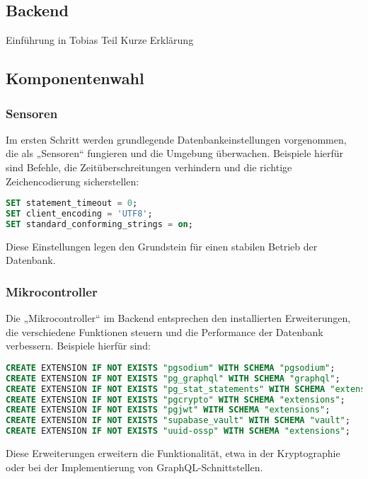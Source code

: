 \begin{inhalt}
\renewcommand*\chapterpagestyle{scrheadings}
\chapter{Backend}

Einführung in Tobias Teil Kurze Erklärung

\section{Komponentenwahl}

\subsection{Sensoren}
Im ersten Schritt werden grundlegende Datenbankeinstellungen vorgenommen, die als „Sensoren“ fungieren und die Umgebung überwachen. Beispiele hierfür sind Befehle, die Zeitüberschreitungen verhindern und die richtige Zeichencodierung sicherstellen:
\begin{lstlisting}[language=SQL, caption=Grundlegende Datenbankeinstellungen]
SET statement_timeout = 0;
SET client_encoding = 'UTF8';
SET standard_conforming_strings = on;
\end{lstlisting}
Diese Einstellungen legen den Grundstein für einen stabilen Betrieb der Datenbank.

\subsection{Mikrocontroller}
Die „Mikrocontroller“ im Backend entsprechen den installierten Erweiterungen, die verschiedene Funktionen steuern und die Performance der Datenbank verbessern. Beispiele hierfür sind:
\begin{lstlisting}[language=SQL, caption=Installation von Erweiterungen]
CREATE EXTENSION IF NOT EXISTS "pgsodium" WITH SCHEMA "pgsodium";
CREATE EXTENSION IF NOT EXISTS "pg_graphql" WITH SCHEMA "graphql";
CREATE EXTENSION IF NOT EXISTS "pg_stat_statements" WITH SCHEMA "extensions";
CREATE EXTENSION IF NOT EXISTS "pgcrypto" WITH SCHEMA "extensions";
CREATE EXTENSION IF NOT EXISTS "pgjwt" WITH SCHEMA "extensions";
CREATE EXTENSION IF NOT EXISTS "supabase_vault" WITH SCHEMA "vault";
CREATE EXTENSION IF NOT EXISTS "uuid-ossp" WITH SCHEMA "extensions";
\end{lstlisting}
Diese Erweiterungen erweitern die Funktionalität, etwa in der Kryptographie oder bei der Implementierung von GraphQL-Schnittstellen.


\end{inhalt}
